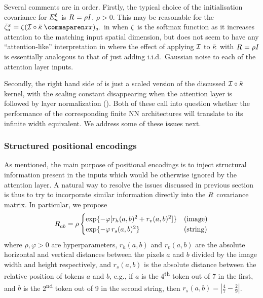 \documentclass{article}
\begin{document}
Several comments are in order.
Firstly, the typical choice of the initialisation covariance for $E_{n}^{\ell}$ is $R_{}^{} = \rho I$, $\rho > 0$. This may be reasonable for the
$
    \softmaxMean_{a}^{\inputSymbol}
    =
    \softmax (
        \interpKern \circ
        \kerntildef{}{}{\inputSymbol}{\inputSymbol}
    )_{a \cdot}
$
in  when $\zeta$ is the softmax function as it increases attention to the matching input spatial dimension, but does not seem to have any ``attention-like'' interpretation in  where the effect of applying $\mathcal{I}$ 
to $\tilde{\kappa}^{}$ with $R_{ }^{} = \rho I$
is essentially analogous to that of just adding i.i.d.\ Gaussian noise to each of the attention layer inputs.

Secondly, the right hand side of  is just a scaled version of the discussed $\mathcal{I} \circ \tilde{\kappa}$ kernel,
with the scaling constant disappearing when the attention layer is followed by layer normalization ().
Both of these call into question whether the performance of the corresponding finite NN architectures will translate to its infinite width equivalent.
We address some of these issues next.



\subsubsection{Structured positional encodings}\label{sect:struct_pe}

As mentioned, the main purpose of positional encodings is to inject structural information present in the inputs which would be otherwise ignored by the attention layer.
A natural way to resolve the issues discussed in previous section is thus to try to incorporate similar information directly into the $R_{}^{}$ covariance matrix.
In particular, we propose
\begin{align}\label{eq:decay_pos_emb}
    R_{a b}^{}
    =
    \rho
    \begin{cases}
        \exp \{ -\varphi [r_{h}(a, b)^2 + r_{v}(a, b)^2 ] \}
        & \text{(image)} \\
        \exp \{ -\varphi \, r_{s}(a, b)^2 \}
        & \text{(string)}
    \end{cases}
\end{align}
where $\rho, \varphi > 0$ are hyperparameters, $r_h (a, b)$ and $r_v(a, b)$ are the absolute horizontal and vertical distances between the pixels $a$ and $b$ divided by the image width and height respectively, and $r_s(a, b)$ is the absolute distance between the relative position of tokens $a$ and $b$, e.g., if $a$ is the 4\textsuperscript{th} token out of 7 in the first, and $b$ is the 2\textsuperscript{nd} token out of 9 in the second string, then $r_s(a, b) = |\frac{4}{7} - \frac{2}{9}|$.
\end{document}
